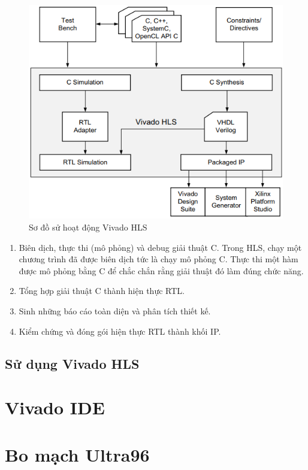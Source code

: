         \begin{figure}[htp]
    		\centering
     		\includegraphics[scale=.8]{images/vivadohlsflow.png}
    		\caption{Sơ đồ sử hoạt động Vivado HLS}
    		\label{fig:vivadohlsflow}
    	\end{figure}
    	
        \begin{enumerate}
            \item Biên dịch, thực thi (mô phỏng) và debug giải thuật C.
            Trong HLS, chạy một chương trình đã được biên dịch tức là chạy mô phỏng C. Thực thi một hàm được mô phỏng bằng C để chắc chắn rằng giải thuật đó làm đúng chức năng.
            \item Tổng hợp giải thuật C thành hiện thực RTL.
            \item Sinh những báo cáo toàn diện và phân tích thiết kế.
            \item Kiểm chứng và đóng gói hiện thực RTL thành khối IP.
        \end{enumerate}
        \subsection{Sử dụng Vivado HLS}
    \section{Vivado IDE}
    \section{Bo mạch Ultra96}
